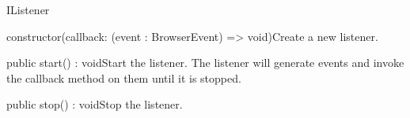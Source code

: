 \begin{interface}{IListener}




\begin{constructors}
\begin{constructor}{constructor(callback: (event : BrowserEvent) => void)}{Create a new listener.}
\begin{parameters}
\end{parameters}
\end{constructor}
\end{constructors}
\begin{methods}
\begin{method}{public start() : void}{Start the listener. The listener will generate events and invoke the callback method on them until it is stopped.}
\end{method}
\begin{method}{public stop() : void}{Stop the listener.}
\end{method}
\end{methods}
\end{interface}